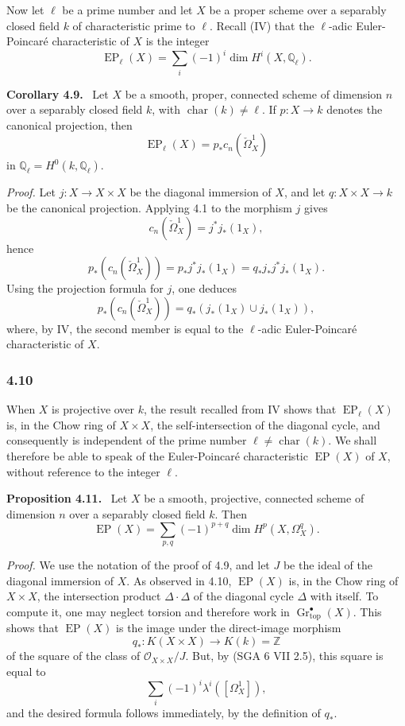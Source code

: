 \documentclass[11pt]{article}
\newenvironment{statement}[1]{\par\medskip\noindent\textbf{#1.}\ }{\par\medskip}
\begin{document}
Now let $\ell$ be a prime number and let $X$ be a proper scheme over a separably closed field $k$ of characteristic prime to $\ell$. Recall (IV) that the $\ell$-adic Euler-Poincaré characteristic of $X$ is the integer
\[
\operatorname{EP}_\ell(X)=\sum_i(-1)^i\dim H^i(X,\mathbb Q_\ell).
\]

\begin{statement}{Corollary 4.9}
Let $X$ be a smooth, proper, connected scheme of dimension $n$ over a separably closed field $k$, with $\operatorname{char}(k)\ne\ell$. If $p:X\to k$ denotes the canonical projection, then
\[
\operatorname{EP}_\ell(X)=p_*c_n(\check\Omega^1_X)
\]
in $\mathbb Q_\ell=H^0(k,\mathbb Q_\ell)$.
\end{statement}

\emph{Proof.} Let $j:X\to X\times X$ be the diagonal immersion of $X$, and let $q:X\times X\to k$ be the canonical projection. Applying 4.1 to the morphism $j$ gives
\[
c_n(\check\Omega^1_X)=j^*j_*(1_X),
\]
hence
\[
p_*(c_n(\check\Omega^1_X))=p_*j^*j_*(1_X)=q_*j_*j^*j_*(1_X).
\]
Using the projection formula for $j$, one deduces
\[
p_*(c_n(\check\Omega^1_X))=q_*(j_*(1_X)\cup j_*(1_X)),
\]
where, by IV, the second member is equal to the $\ell$-adic Euler-Poincaré characteristic of $X$.

\subsubsection*{4.10}
When $X$ is projective over $k$, the result recalled from IV shows that $\operatorname{EP}_\ell(X)$ is, in the Chow ring of $X\times X$, the self-intersection of the diagonal cycle, and consequently is independent of the prime number $\ell\ne\operatorname{char}(k)$. We shall therefore be able to speak of the Euler-Poincaré characteristic $\operatorname{EP}(X)$ of $X$, without reference to the integer $\ell$.

\begin{statement}{Proposition 4.11}
Let $X$ be a smooth, projective, connected scheme of dimension $n$ over a separably closed field $k$. Then
\[
\operatorname{EP}(X)=\sum_{p,q}(-1)^{p+q}\dim H^p(X,\Omega_X^q).
\]
\end{statement}

\emph{Proof.} We use the notation of the proof of 4.9, and let $J$ be the ideal of the diagonal immersion of $X$. As observed in 4.10, $\operatorname{EP}(X)$ is, in the Chow ring of $X\times X$, the intersection product $\Delta\cdot\Delta$ of the diagonal cycle $\Delta$ with itself. To compute it, one may neglect torsion and therefore work in $\operatorname{Gr}_{\mathrm{top}}^\bullet(X)$. This shows that $\operatorname{EP}(X)$ is the image under the direct-image morphism
\[
q_*:K(X\times X)\to K(k)=\mathbb Z
\]
of the square of the class of $\mathcal O_{X\times X}/J$. But, by (SGA 6 VII 2.5), this square is equal to
\[
\sum_i(-1)^i\lambda^i([\Omega_X^1]),
\]
and the desired formula follows immediately, by the definition of $q_*$.
\end{document}
